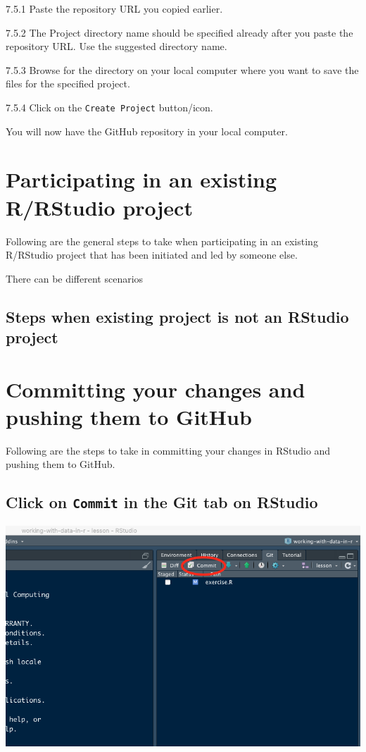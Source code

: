 \documentclass[
  12pt,
]{book}
\begin{document}
7.5.1 Paste the repository URL you copied earlier.

7.5.2 The Project directory name should be specified already after you paste the repository URL. Use the suggested directory name.

7.5.3 Browse for the directory on your local computer where you want to save the files for the specified project.

7.5.4 Click on the \texttt{Create\ Project} button/icon.

You will now have the GitHub repository in your local computer.

\hypertarget{participate-projects}{%
\chapter{Participating in an existing R/RStudio project}\label{participate-projects}}

Following are the general steps to take when participating in an existing R/RStudio project that has been initiated and led by someone else.

There can be different scenarios

\hypertarget{steps-when-existing-project-is-not-an-rstudio-project}{%
\section{Steps when existing project is not an RStudio project}\label{steps-when-existing-project-is-not-an-rstudio-project}}

\hypertarget{commit-and-push}{%
\chapter{Committing your changes and pushing them to GitHub}\label{commit-and-push}}

Following are the steps to take in committing your changes in RStudio and pushing them to GitHub.

\hypertarget{click-on-commit-in-the-git-tab-on-rstudio}{%
\section{\texorpdfstring{Click on \texttt{Commit} in the Git tab on RStudio}{Click on Commit in the Git tab on RStudio}}\label{click-on-commit-in-the-git-tab-on-rstudio}}

\includegraphics{images/commit_push_pull1.png}
\end{document}
